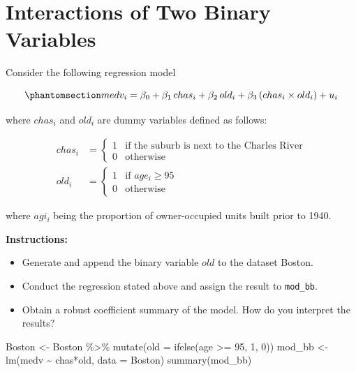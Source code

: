 \documentclass[
  12pt,
  letterpaper,
]{scrbook}
\newenvironment{Shaded}{\begin{snugshade}}{\end{snugshade}}
\newcommand{\AttributeTok}[1]{\textcolor[rgb]{0.40,0.45,0.13}{#1}}
\newcommand{\DecValTok}[1]{\textcolor[rgb]{0.68,0.00,0.00}{#1}}
\newcommand{\FunctionTok}[1]{\textcolor[rgb]{0.28,0.35,0.67}{#1}}
\newcommand{\NormalTok}[1]{\textcolor[rgb]{0.00,0.23,0.31}{#1}}
\newcommand{\OtherTok}[1]{\textcolor[rgb]{0.00,0.23,0.31}{#1}}
\newcommand{\SpecialCharTok}[1]{\textcolor[rgb]{0.37,0.37,0.37}{#1}}
\providecommand{\tightlist}{%
  \setlength{\itemsep}{0pt}\setlength{\parskip}{0pt}}
\renewcommand{\tightlist}{\setlength{\itemsep}{0.5\baselineskip}\setlength{\parskip}{0.2\baselineskip}}
\theoremstyle{plain}
\theoremstyle{definition}
\theoremstyle{remark}
\begin{document}
\section{Interactions of Two Binary
Variables}\label{interactions-of-two-binary-variables}

Consider the following regression model

\begin{equation}\phantomsection\label{eq-binary-interaction}{
medv_i = \beta_0 + \beta_1\, chas_i + \beta_2\, old_i + \beta_3\, (chas_i \times old_i) + u_i
}\end{equation}

where \(chas_i\) and \(old_i\) are dummy variables defined as follows:

\[
\begin{aligned}
chas_i &= \begin{cases}
1 & \text{if the suburb is next to the Charles River} \\
0 & \text{otherwise}
\end{cases} \\
old_i &= \begin{cases}
1 & \text{if } age_i \ge 95 \\
0 & \text{otherwise}
\end{cases}
\end{aligned}
\]

where \(agi_i\) being the proportion of owner-occupied units built prior
to 1940.

\textbf{Instructions:}

\begin{itemize}
\tightlist
\item
  Generate and append the binary variable \(old\) to the dataset Boston.
\item
  Conduct the regression stated above and assign the result to
  \texttt{mod\_bb}.
\item
  Obtain a robust coefficient summary of the model. How do you interpret
  the results?
\end{itemize}

\begin{Shaded}
\begin{Highlighting}[]
\NormalTok{Boston }\OtherTok{\textless{}{-}}\NormalTok{ Boston }\SpecialCharTok{\%\textgreater{}\%}
    \FunctionTok{mutate}\NormalTok{(}\AttributeTok{old =} \FunctionTok{ifelse}\NormalTok{(age }\SpecialCharTok{\textgreater{}=} \DecValTok{95}\NormalTok{, }\DecValTok{1}\NormalTok{, }\DecValTok{0}\NormalTok{))}
\NormalTok{mod\_bb }\OtherTok{\textless{}{-}} \FunctionTok{lm}\NormalTok{(medv }\SpecialCharTok{\textasciitilde{}}\NormalTok{ chas}\SpecialCharTok{*}\NormalTok{old, }\AttributeTok{data =}\NormalTok{ Boston)}
\FunctionTok{summary}\NormalTok{(mod\_bb)}
\end{Highlighting}
\end{Shaded}
\end{document}
